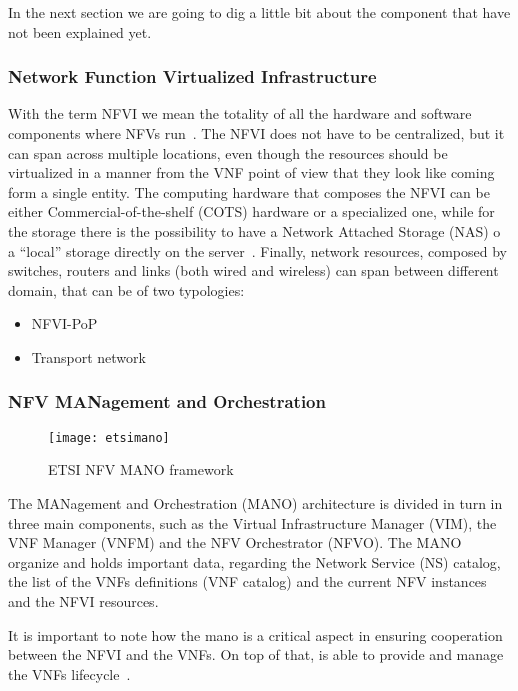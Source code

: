 In the next section we are going to dig a little bit about the component that
have not been explained yet.

\subsubsection{Network Function Virtualized Infrastructure}
With the term NFVI we mean the totality of all the hardware and software
components where NFVs run~\cite{etsi2013gs}. The NFVI does not have to be
centralized, but it can span across multiple locations, even though the
resources should be virtualized in a manner from the VNF point of view that they
look like coming form a single entity. The computing hardware that composes the
NFVI can be either Commercial-of-the-shelf (COTS) hardware or a specialized one,
while for the storage there is the possibility to have a Network Attached
Storage (NAS) o a ``local'' storage directly on the server~\cite{etsi2013gs}.
Finally, network resources, composed by switches, routers and links (both wired
and wireless) can span between different domain, that can be of two typologies:
\begin{itemize}
\item NFVI-PoP
\item Transport network
\end{itemize}

\subsubsection{NFV MANagement and Orchestration}

\begin{figure}[t]
  \centering
  \texttt{[image: etsimano]}
  \caption[ETSI NFV MANO framework]{ETSI NFV MANO
    framework~\cite{mijumbi2016management}}
  \label{chap:background:img:etsimano}
\end{figure}

The MANagement and Orchestration (MANO) architecture is divided in turn in three
main components, such as the Virtual Infrastructure Manager (VIM), the VNF
Manager (VNFM) and the NFV Orchestrator (NFVO). The MANO organize and holds
important data, regarding the Network Service (NS) catalog, the list of the VNFs
definitions (VNF catalog) and the current NFV instances and the NFVI resources.

It is important to note how the mano is a critical aspect in ensuring
cooperation between the NFVI and the VNFs. On top of that, is able to provide
and manage the VNFs lifecycle~\cite{mijumbi2016management}.

